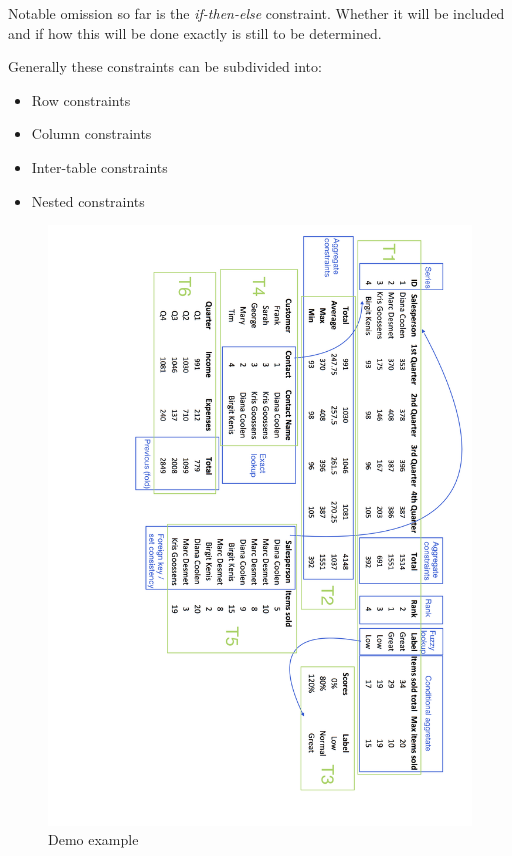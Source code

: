 \documentclass[a4paper]{article}
\begin{document}
Notable omission so far is the \textit{if-then-else} constraint. Whether it will be included and if how this will be done exactly is still to be determined.

Generally these constraints can be subdivided into:

\begin{itemize}
	\item Row constraints
	\item Column constraints
	\item Inter-table constraints
	\item Nested constraints
\end{itemize}

\begin{figure}
  \centering
    \includegraphics[width=1\linewidth]{../Demo.png}
  \caption{Demo example}
  \label{fig:demo}
\end{figure}
\end{document}
